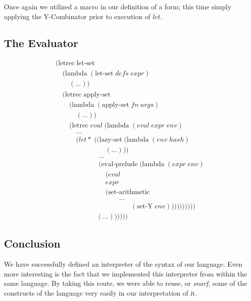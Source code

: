 Once again we utilized a macro in our definition of a form; this time simply
applying the Y-Combinator prior to execution of $let$.

\clearpage
\subsection{The Evaluator}
\begin{figure}[ht]
\caption{}\label{scheme}
\begin{align*}
& (\text{letrec} \; \text{let-set} \; 
\\& \quad (\text{lambda} \; (\text{let-set} \; defs \; expr)
\\& \qquad (\dots))
\\& \quad (\text{letrec} \; \text{apply-set} \; 
\\& \qquad (\text{lambda} \; (\text{apply-set} \; fn \; args)
\\& \qquad \quad (\dots))
\\& \qquad (\text{letrec} \; eval \; (\text{lambda} \; (eval \; expr \; env)
\\& \qquad \quad \dots
\\& \qquad \quad (let* \; ((\text{lazy-set} \; (\text{lambda} \; (env \; hash)
\\& \qquad \qquad \qquad \quad \; (\dots)))
\\& \qquad \qquad \qquad \; \dots
\\& \qquad \qquad \qquad \; (\text{eval-prelude} \; (\text{lambda} \; (expr \; env)
\\& \qquad \qquad \qquad \quad \; (eval
\\& \qquad \qquad \qquad \quad \; expr
\\& \qquad \qquad \qquad \quad \; (\text{set-arithmetic}
\\& \qquad \qquad \qquad \qquad \quad \; \dots
\\& \qquad \qquad \qquad \qquad \qquad \quad (\text{set-Y} \; env))))))))))
\\& \qquad \qquad \qquad (\dots))))))
\end{align*}
\end{figure}

\subsection{Conclusion}
We have successfully defined an interpreter of the syntax of our language.
Even more interesting is the fact that we implemented this interpreter from
within the same language. By taking this route, we were able to reuse, or
\emph{snarf}, some of the constructs of the language very easily in our
interpretation of it.

